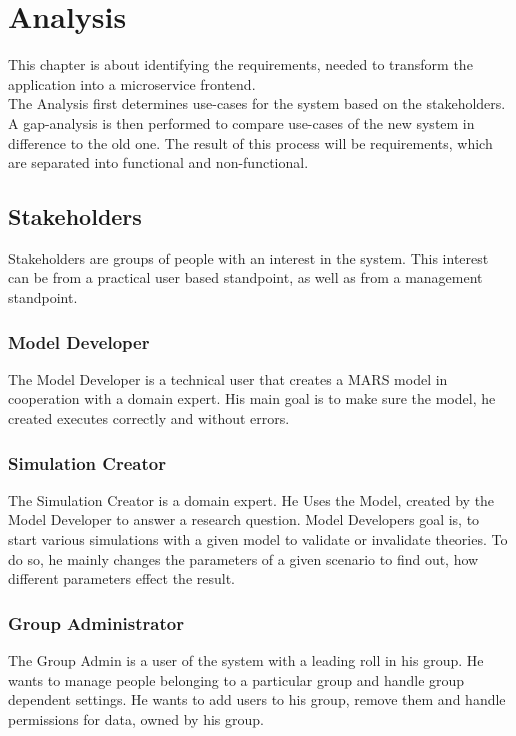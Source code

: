 
\chapter{Analysis}
This chapter is about identifying the requirements, needed to transform the application into a microservice frontend.\\
The Analysis first determines use-cases for the system based on the stakeholders. A gap-analysis is then performed to compare use-cases of the new system in difference to the old one. The result of this process will be requirements, which are separated into functional and non-functional.


\section{Stakeholders}
Stakeholders are groups of people with an interest in the system. This interest can be from a practical user based standpoint, as well as from a management standpoint.

\subsection{Model Developer}
The Model Developer is a technical user that creates a MARS model in cooperation with a domain expert. His main goal is to make sure the model, he created executes correctly and without errors.

\subsection{Simulation Creator}
The Simulation Creator is a domain expert. He Uses the Model, created by the Model Developer to answer a research question. Model Developers goal is, to start various simulations with a given model to validate or invalidate theories. To do so, he mainly changes the parameters of a given scenario to find out, how different parameters effect the result.

\subsection{Group Administrator}
The Group Admin is a user of the system with a leading roll in his group. He wants to manage people belonging to a particular group and handle group dependent settings. He wants to add users to his group, remove them and handle permissions for data, owned by his group.

